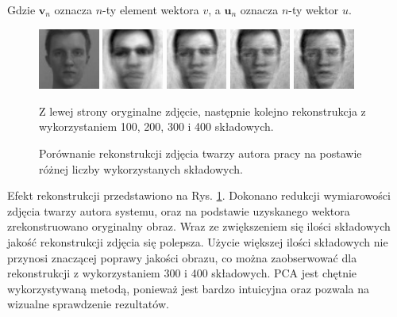 \documentclass[oneside, eng]{mgr}
\newcommand{\bb}{\textbf}
\begin{document}
Gdzie $\bb{v}_n$ oznacza $n$-ty element wektora $v$, a $\bb{u}_n$ oznacza $n$-ty wektor $u$.

\begin{figure}
\centering
	\parbox{2cm}{
		\includegraphics[width=2cm]{face_1.jpg}
		}
		\qquad
		\begin{minipage}{2cm}
			\includegraphics[width=2cm]{100.jpg}
		\end{minipage}
		\begin{minipage}{2cm}
			\includegraphics[width=2cm]{200.jpg}
		\end{minipage}
		\begin{minipage}{2cm}
			\includegraphics[width=2cm]{300.jpg}
		\end{minipage}
		\begin{minipage}{2cm}
			\includegraphics[width=2cm]{400.jpg}
		\end{minipage}
	\caption{Porównanie rekonstrukcji zdjęcia twarzy autora pracy na postawie różnej liczby wykorzystanych składowych.} 
	Z lewej strony oryginalne zdjęcie, następnie kolejno rekonstrukcja z wykorzystaniem 100, 200, 300 i 400 składowych.
	\label{fig:rekonstrukcja}
\end{figure}

Efekt rekonstrukcji przedstawiono na Rys. \ref{fig:rekonstrukcja}. Dokonano redukcji wymiarowości zdjęcia twarzy autora systemu, oraz na podstawie uzyskanego wektora zrekonstruowano oryginalny obraz. Wraz ze zwiększeniem się ilości składowych jakość rekonstrukcji zdjęcia się polepsza. Użycie większej ilości składowych nie przynosi znaczącej poprawy jakości obrazu, co można zaobserwować dla rekonstrukcji z wykorzystaniem 300 i 400 składowych. PCA jest chętnie wykorzystywaną metodą, ponieważ jest bardzo intuicyjna oraz pozwala na wizualne sprawdzenie rezultatów.
\end{document}
